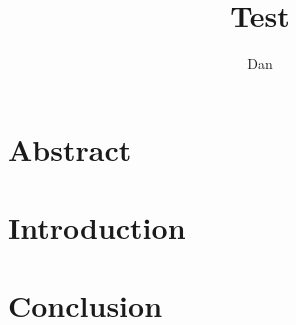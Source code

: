 \documentclass[mla8]{mla}
\title{Test}
\author{Dan}
\date{\mladate}
\begin{document}
\section{Abstract}
\section{Introduction}
\section{Conclusion}
\begin{paper}
\end{paper}
\begin{workscited}
\printbibliography[heading=none]
\end{workscited}
\end{document}
